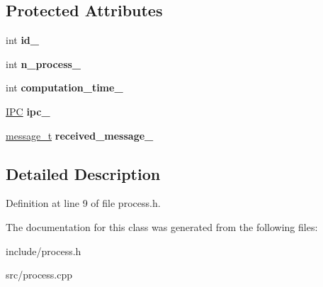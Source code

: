 \subsection*{Protected Attributes}
\begin{DoxyCompactItemize}
\item 
int {\bfseries id\+\_\+}\hypertarget{classdistributed__system_1_1Process_aafd0c2f55b73e7a1d4bd1174fdebbcf8}{}\label{classdistributed__system_1_1Process_aafd0c2f55b73e7a1d4bd1174fdebbcf8}

\item 
int {\bfseries n\+\_\+process\+\_\+}\hypertarget{classdistributed__system_1_1Process_a289b1e6562f8fb42908a202b2f6485ff}{}\label{classdistributed__system_1_1Process_a289b1e6562f8fb42908a202b2f6485ff}

\item 
int {\bfseries computation\+\_\+time\+\_\+}\hypertarget{classdistributed__system_1_1Process_a6240cc652eb1f42271c5d259e468449e}{}\label{classdistributed__system_1_1Process_a6240cc652eb1f42271c5d259e468449e}

\item 
\hyperlink{classdistributed__system_1_1IPC}{I\+PC} {\bfseries ipc\+\_\+}\hypertarget{classdistributed__system_1_1Process_a2b91c717adb1a58d751fbce17f19d50a}{}\label{classdistributed__system_1_1Process_a2b91c717adb1a58d751fbce17f19d50a}

\item 
\hyperlink{structdistributed__system_1_1message__t}{message\+\_\+t} {\bfseries received\+\_\+message\+\_\+}\hypertarget{classdistributed__system_1_1Process_a08cdc7cdd554e995921af2430e00eece}{}\label{classdistributed__system_1_1Process_a08cdc7cdd554e995921af2430e00eece}

\end{DoxyCompactItemize}


\subsection{Detailed Description}


Definition at line 9 of file process.\+h.



The documentation for this class was generated from the following files\+:\begin{DoxyCompactItemize}
\item 
include/process.\+h\item 
src/process.\+cpp\end{DoxyCompactItemize}
